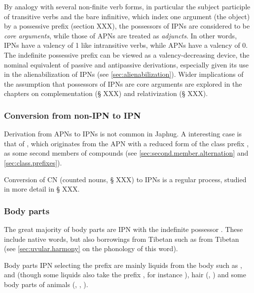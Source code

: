 By analogy with several non-finite verb forms, in particular the subject participle of transitive verbs and the bare infinitive, which index one argument (the object) by a possessive prefix (section XXX), the possessors of IPNs are considered to be \textit{core arguments}, while those of APNs are treated as \textit{adjuncts}. In other words, IPNs have a valency of 1 like intransitive verbs, while APNs have a valency of 0. The indefinite possessive prefix can be viewed as a valency-decreasing device, the nominal equivalent of passive and antipassive derivations, especially given its use in the alienabilization of IPNs (see \ref{sec:alienabilization}). Wider implications of the assumption that possessors of IPNs are core arguments are explored in the chapters on complementation (§  XXX) and relativization (§  XXX).

\subsubsection{Conversion from non-IPN to IPN} \label{sec:apn.to.ipn}
Derivation from APNs to IPNs is not common in Japhug. A interesting case is that of , which originates from the APN  with a reduced form  of the class prefix , as some second members of compounds (see \ref{sec:second.member.alternation} and \ref{sec:class.prefixes}).

Conversion of CN (counted nouns, § XXX) to IPNs is a regular process, studied in more detail in § XXX.

\subsubsection{Body parts} \label{sec:body.part}
The great majority of body parts are IPN with the indefinite possessor . These include native words, but also borrowings from Tibetan such as  from Tibetan  (see \ref{sec:uvular.harmony} on the phonology of this word).

Body parts IPN selecting the prefix  are mainly liquids from the body such as ,  and  (though some liquids also take the prefix , for instance ), hair (, ) and some body parts of animals (, , ).

